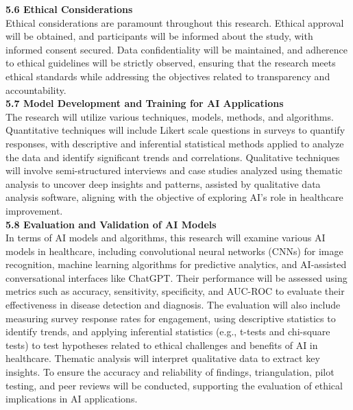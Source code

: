 \documentclass[a4paper, 12pt]{article}
\begin{document}
\textbf{5.6 \hspace{5mm} Ethical Considerations}\\ 
Ethical considerations are paramount throughout this research. Ethical approval will be obtained, and participants will be informed about the study, with informed consent secured. Data confidentiality will be maintained, and adherence to ethical guidelines will be strictly observed, ensuring that the research meets ethical standards while addressing the objectives related to transparency and accountability.\\

\textbf{5.7 \hspace{5mm} Model Development and Training for AI Applications}\\
The research will utilize various techniques, models, methods, and algorithms. Quantitative techniques will include Likert scale questions in surveys to quantify responses, with descriptive and inferential statistical methods applied to analyze the data and identify significant trends and correlations. Qualitative techniques will involve semi-structured interviews and case studies analyzed using thematic analysis to uncover deep insights and patterns, assisted by qualitative data analysis software, aligning with the objective of exploring AI's role in healthcare improvement.\\

\textbf{5.8 \hspace{5mm} Evaluation and Validation of AI Models}\\
In terms of AI models and algorithms, this research will examine various AI models in healthcare, including convolutional neural networks (CNNs) for image recognition, machine learning algorithms for predictive analytics, and AI-assisted conversational interfaces like ChatGPT. Their performance will be assessed using metrics such as accuracy, sensitivity, specificity, and AUC-ROC to evaluate their effectiveness in disease detection and diagnosis. The evaluation will also include measuring survey response rates for engagement, using descriptive statistics to identify trends, and applying inferential statistics (e.g., t-tests and chi-square tests) to test hypotheses related to ethical challenges and benefits of AI in healthcare. Thematic analysis will interpret qualitative data to extract key insights. To ensure the accuracy and reliability of findings, triangulation, pilot testing, and peer reviews will be conducted, supporting the evaluation of ethical implications in AI applications.\\
\end{document}
